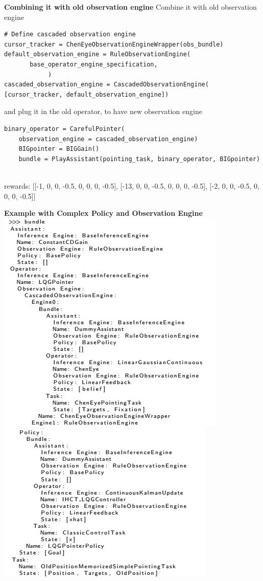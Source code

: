 \documentclass[11pt, xcolor = {dvipsnames}]{beamer}
\begin{document}
\begin{frame}[fragile]{\textbf{Combining it with old observation engine}}
Combine it with old observation engine
\begin{adjustbox}{width=\textwidth}
\lstset{language=Python}
\lstset{frame=lines}
\lstset{basicstyle=\footnotesize}
\begin{lstlisting}
# Define cascaded observation engine
cursor_tracker = ChenEyeObservationEngineWrapper(obs_bundle)
default_observation_engine = RuleObservationEngine(
       base_operator_engine_specification,
            )
cascaded_observation_engine = CascadedObservationEngine(
[cursor_tracker, default_observation_engine])

\end{lstlisting}
\end{adjustbox}
and plug it in the old operator, to have  new observation engine
\begin{adjustbox}{width=\textwidth}
\lstset{language=Python}
\lstset{frame=lines}
\lstset{basicstyle=\footnotesize}
\begin{lstlisting}
binary_operator = CarefulPointer(
	observation_engine = cascaded_observation_engine)
    BIGpointer = BIGGain()
    bundle = PlayAssistant(pointing_task, binary_operator, BIGpointer)


\end{lstlisting}
\end{adjustbox}

\vspace{\baselineskip}

rewards:
[[-1, 0, 0, -0.5, 0, 0, 0, -0.5], [-13, 0, 0, -0.5, 0, 0, 0, -0.5], [-2, 0, 0, -0.5, 0, 0, 0, -0.5]]

\end{frame}


\begin{frame}{\textbf{Example with Complex Policy and Observation Engine}}
\includegraphics[width=.49\textwidth]{fig/b_1.png}%
\includegraphics[width=.49\textwidth]{fig/b_2.png}
\end{frame}
\end{document}
